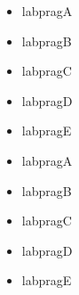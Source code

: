\documentclass[a4paper]{article}%
\begin{document}
%
%
%


\begin{itemize}[labpragA]
\item%
    labpragA
\end{itemize}
\begin{itemize}[labpragB]
\item%
    labpragB
\end{itemize}
\begin{itemize}[labpragC]
\item%
    labpragC
\end{itemize}
\begin{itemize}[labpragD]
\item%
    labpragD
\end{itemize}
\begin{itemize}[labpragE]
\item%
    labpragE
\end{itemize}

\par\vspace{\baselineskip}
\begin{itemize}[labpragA]
\item%
    labpragA
\item[\labpragBsym]%
    labpragB
\item[\labpragCsym]%
    labpragC
\item[\labpragDsym]%
    labpragD
\item[\labpragEsym]%
    labpragE
\end{itemize}
\npi%
\end{document}
